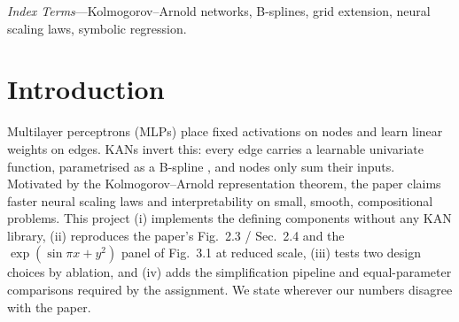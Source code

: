 \begin{abstract}
We re-implement Kolmogorov--Arnold Networks (KANs) \cite{liu2025kan} from scratch in PyTorch: Cox--de Boor B-splines, the residual spline edge function, KAN layers, on-the-fly grid update and least-squares \emph{grid extension}, plus sparsification, pruning and symbolic simplification. At reduced scale we reproduce the central qualitative findings on $f(x,y)=\exp(\sin\pi x+y^2)$: staircase loss curves under grid extension, power-law decay of test error with grid size, and a KAN with 315 parameters (test RMSE $1.8\times10^{-5}$) beating parameter-matched MLPs by about 60$\times$ (best MLP, 501 parameters: $1.2\times10^{-3}$). The result is fragile, however: only one of four seeds reaches this regime and the median KAN is worse than the best MLP. Two ablations show that grid extension helps at large $G$ but not at small $G$, and that higher spline order lowers the error. Extensions to Feynman symbolic regression, a Poisson PDE and MNIST give a mixed picture (single seed each): the KAN beats an equal-parameter MLP on three of six Feynman equations and on the PDE only modestly and only at the largest size, loses on MNIST (92--94\% vs.\ 97\%), and automatic symbolic simplification did not recover any of the target formulas (Sec.~\ref{sec:ext}).
\end{abstract}
\par\vspace{2pt}\noindent\textit{Index Terms}---Kolmogorov--Arnold networks, B-splines, grid extension, neural scaling laws, symbolic regression.

\section{Introduction}
Multilayer perceptrons (MLPs) place fixed activations on nodes and learn linear weights on edges. KANs \cite{liu2025kan} invert this: every edge carries a learnable univariate function, parametrised as a B-spline \cite{deboor1978}, and nodes only sum their inputs. Motivated by the Kolmogorov--Arnold representation theorem, the paper claims faster neural scaling laws and interpretability on small, smooth, compositional problems. This project (i) implements the defining components without any KAN library, (ii) reproduces the paper's Fig.~2.3 / Sec.~2.4 and the $\exp(\sin\pi x+y^2)$ panel of Fig.~3.1 at reduced scale, (iii) tests two design choices by ablation, and (iv) adds the simplification pipeline and equal-parameter comparisons required by the assignment. We state wherever our numbers disagree with the paper.

